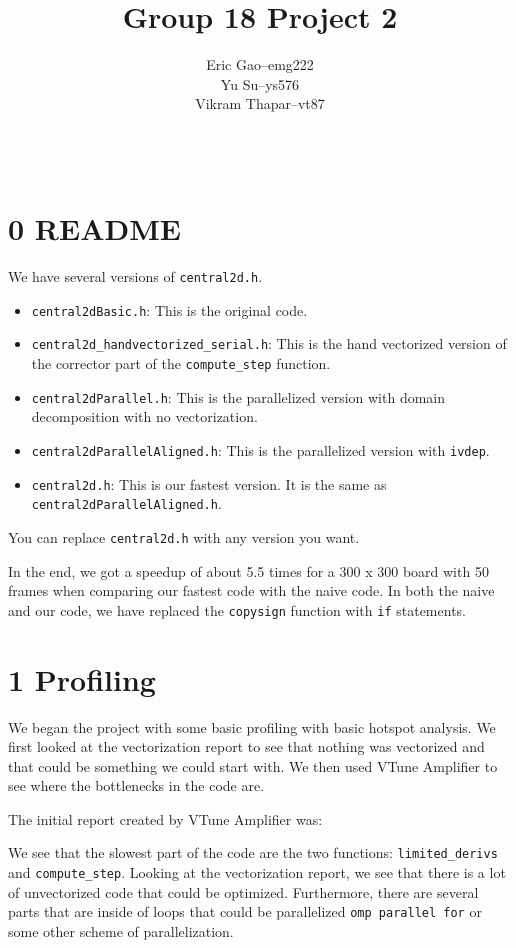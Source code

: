 \documentclass[11pt]{article}
\title{Group 18 Project 2} %
\author{
  \begin{tabular}{l c l}
    Eric Gao & -- & emg222\\
    Yu Su    & -- & ys576\\
    Vikram Thapar & -- & vt87
  \end{tabular}\\
  \rule{\linewidth}{0.4pt}
}
\date{}
\begin{document}
    \thispagestyle{empty}
    \maketitle

    \section{0 README}
        We have several versions of \texttt{central2d.h}.
        \begin{itemize}
            \item \texttt{central2dBasic.h}: This is the original code.
            \item \texttt{central2d\_handvectorized\_serial.h}: This is the hand vectorized version of the corrector part of the \texttt{compute\_step} function. 
            \item \texttt{central2dParallel.h}: This is the parallelized version with domain decomposition with no vectorization.
            \item \texttt{central2dParallelAligned.h}: This is the parallelized version with \texttt{ivdep}.
            \item \texttt{central2d.h}: This is our fastest version. It is the same as \texttt{central2dParallelAligned.h}.
        \end{itemize}

        You can replace \texttt{central2d.h} with any version you want.

        In the end, we got a speedup of about 5.5 times for a 300 x 300 board with 50 frames when comparing our fastest code with the naive code. In both the naive and our code, we have replaced the \texttt{copysign} function with \texttt{if} statements.

    \section{1 Profiling}
        We began the project with some basic profiling with basic hotspot analysis. We first looked at the vectorization report to see that nothing was vectorized and that could be something we could start with. We then used VTune Amplifier to see where the bottlenecks in the code are.

        The initial report created by VTune Amplifier was:
        

        We see that the slowest part of the code are the two functions: \texttt{limited\_derivs} and \texttt{compute\_step}. Looking at the vectorization report, we see that there is a lot of unvectorized code that could be optimized. Furthermore, there are several parts that are inside of loops that could be parallelized \texttt{omp parallel for} or some other scheme of parallelization.
\end{document}
